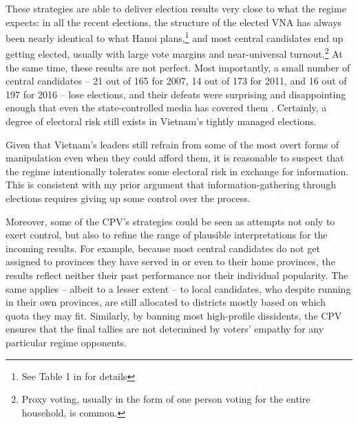 \documentclass[12pt]{article}
\newcommand{\1}{\mathbbm{1}}
\begin{document}
These strategies are able to deliver election results very close to what the regime expects: in all the recent elections, the structure of the elected VNA has always been nearly identical to what Hanoi plans,\footnote{See Table 1 in \citep[506][prefix]{MaleskySchuler2011} for  details} and most central candidates end up getting elected, usually with large vote margins and near-universal turnout.\footnote{Proxy voting, usually in the form of one person voting for the entire household, is common.} At the same time, these results are not perfect. Most importantly, a small number of central candidates -- 21 out of 165 for 2007, 14 out of 173 for 2011, and 16 out of 197 for 2016 -- lose elections, and their defeats were surprising and disappointing enough that even the state-controlled media has covered them \citep[e.g.][]{vov2016, laodong2016}. Certainly, a degree of electoral risk still exists in Vietnam's tightly managed elections.

Given that Vietnam's leaders still refrain from some of the most overt forms of manipulation even when they could afford them, it is reasonable to suspect that the regime intentionally tolerates some electoral risk in exchange for information. This is consistent with my prior argument that information-gathering through elections requires giving up some control over the process.

Moreover, some of the CPV's strategies could be seen as attempts not only to exert control, but also to refine the range of plausible interpretations for the incoming results. For example, because most central candidates do not get assigned to provinces they have served in or even to their home provinces, the results reflect neither their past performance nor their individual popularity. The same applies -- albeit to a lesser extent -- to local candidates, who despite running in their own provinces, are still allocated to districts mostly based on which quota they may fit. Similarly, by banning most high-profile dissidents, the CPV ensures that the final tallies are not determined by voters' empathy for any particular regime opponents.
\end{document}
